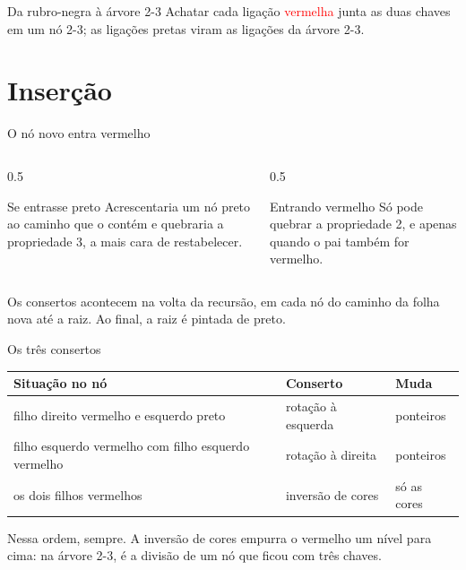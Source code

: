 \documentclass{beamer}
\newcommand{\tcr}[1]{\textcolor{red}{#1}}
\begin{document}
\begin{frame}{Da rubro-negra à árvore 2-3}
	\small
	Achatar cada ligação \tcr{vermelha} junta as duas chaves em um nó 2-3; as
	ligações pretas viram as ligações da árvore 2-3.
\end{frame}

\section{Inserção}

\begin{frame}{O nó novo entra vermelho}
	\begin{columns}
		\begin{column}{0.5\textwidth}
			\begin{block}{Se entrasse preto}
				Acrescentaria um nó preto ao caminho que o contém e quebraria a
				propriedade 3, a mais cara de restabelecer.
			\end{block}
		\end{column}
		\begin{column}{0.5\textwidth}
			\begin{block}{Entrando vermelho}
				Só pode quebrar a propriedade 2, e apenas quando o pai também for
				vermelho.
			\end{block}
		\end{column}
	\end{columns}

	\vspace{0.5cm}
	Os consertos acontecem na volta da recursão, em cada nó do caminho da folha
	nova até a raiz. Ao final, a raiz é pintada de preto.
\end{frame}

\begin{frame}{Os três consertos}
	\begin{center}
		\small
		\begin{tabular}{p{4.6cm}ll}
			\toprule
			\textbf{Situação no nó}                             & \textbf{Conserto}  & \textbf{Muda} \\
			\midrule
			filho direito vermelho e esquerdo preto             & rotação à esquerda & ponteiros     \\
			filho esquerdo vermelho com filho esquerdo vermelho & rotação à direita  & ponteiros     \\
			os dois filhos vermelhos                            & inversão de cores  & só as cores   \\
			\bottomrule
		\end{tabular}
	\end{center}

	\vspace{0.4cm}
	Nessa ordem, sempre. A inversão de cores empurra o vermelho um nível para
	cima: na árvore 2-3, é a divisão de um nó que ficou com três chaves.
\end{frame}
\end{document}
